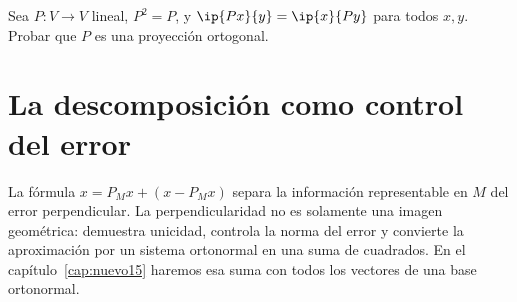\begin{ejercicio}\label{ej:lectura-30-6}
Sea $P:V\to V$ lineal, $P^{2}=P$, y $\ip{Px}{y}=\ip{x}{Py}$ para todos $x,y$. Probar que $P$ es una proyección ortogonal.
\end{ejercicio}


\section{La descomposición como control del error}
La fórmula $x=P_Mx+(x-P_Mx)$ separa la información representable en $M$ del error perpendicular. La perpendicularidad no es solamente una imagen geométrica: demuestra unicidad, controla la norma del error y convierte la aproximación por un sistema ortonormal en una suma de cuadrados. En el capítulo~\ref{cap:nuevo15} haremos esa suma con todos los vectores de una base ortonormal.
